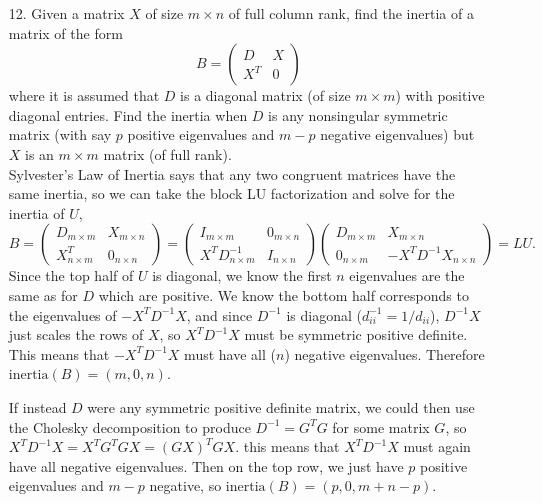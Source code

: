 \documentclass[11pt]{article}
\newcommand{\n}{\vspace{0.3cm}}
\begin{document}
\begin{enumerate}
	\item[12.] Given a matrix \(X\) of size \(m \times n\) of full column rank, find the inertia of a matrix of the form
		\[B = \begin{pmatrix} D & X \\ X^T & 0 \end{pmatrix}\]
		where it is assumed that \(D\) is a diagonal matrix (of size \(m \times m\)) with positive diagonal entries.  Find the inertia when \(D\) is any nonsingular symmetric matrix (with say \(p\) positive eigenvalues and \(m-p\) negative eigenvalues) but \(X\) is an \(m \times m\) matrix (of full rank). \n\\
    Sylvester's Law of Inertia says that any two congruent matrices have the same inertia, so we can take the block LU factorization and solve for the inertia of \(U\),
    \[
        B = \begin{pmatrix} D_{m \times m} & X_{m \times n} \\ X^T_{n \times m} & 0_{n \times n} \end{pmatrix}
          = \begin{pmatrix} I_{m \times m} & 0_{m \times n} \\ X^TD^{-1}_{n \times m} & I_{n \times n} \end{pmatrix}
            \begin{pmatrix} D_{m \times m} & X_{m \times n} \\ 0_{n \times m} & -X^T D^{-1}X_{n \times n} \end{pmatrix}
          = LU.
    \]
    Since the top half of \(U\) is diagonal, we know the first \(n\) eigenvalues are the same as for \(D\) which are positive.  We know the bottom half corresponds to the eigenvalues of \(-X^T D^{-1} X\), and since \(D^{-1}\) is diagonal (\(d^{-1}_{ii} = 1 / d_{ii}\)), \(D^{-1}X\) just scales the rows of \(X\), so \(X^T D^{-1} X\) must be symmetric positive definite.  This means that \(-X^T D^{-1} X\) must have all (\(n\)) negative eigenvalues.  Therefore \(\text{inertia}(B) = (m,0,n)\). \n

    If instead \(D\) were any symmetric positive definite matrix, we could then use the Cholesky decomposition to produce \(D^{-1} = G^T G\) for some matrix \(G\), so \(X^T D^{-1} X = X^T G^T G X = (GX)^T GX\).  this means that \(X^T D^{-1} X\) must again have all negative eigenvalues.  Then on the top row, we just have \(p\) positive eigenvalues and \(m-p\) negative, so \(\text{inertia}(B) = (p, 0, m+n-p)\).
\end{enumerate}
\end{document}
